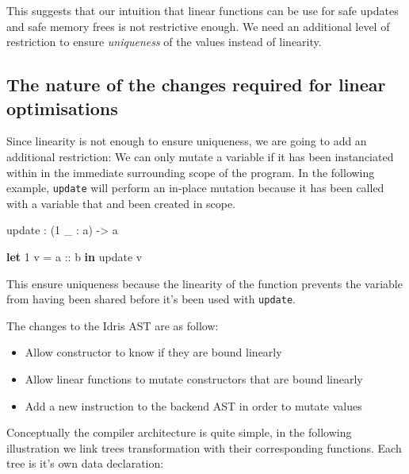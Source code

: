 \documentclass[
]{article}
\newenvironment{Shaded}{}{}
\newcommand{\DecValTok}[1]{\textcolor[rgb]{0.25,0.63,0.44}{#1}}
\newcommand{\KeywordTok}[1]{\textcolor[rgb]{0.00,0.44,0.13}{\textbf{#1}}}
\newcommand{\NormalTok}[1]{#1}
\newcommand{\OperatorTok}[1]{\textcolor[rgb]{0.40,0.40,0.40}{#1}}
\newcommand{\OtherTok}[1]{\textcolor[rgb]{0.00,0.44,0.13}{#1}}
\providecommand{\tightlist}{%
  \setlength{\itemsep}{0pt}\setlength{\parskip}{0pt}}
\begin{document}
This suggests that our intuition that linear functions can be use for
safe updates and safe memory frees is not restrictive enough. We need an
additional level of restriction to ensure \emph{uniqueness} of the
values instead of linearity.

\hypertarget{the-nature-of-the-changes-required-for-linear-optimisations}{%
\subsection{The nature of the changes required for linear
optimisations}\label{the-nature-of-the-changes-required-for-linear-optimisations}}

Since linearity is not enough to ensure uniqueness, we are going to add
an additional restriction: We can only mutate a variable if it has been
instanciated within in the immediate surrounding scope of the program.
In the following example, \texttt{update} will perform an in-place
mutation because it has been called with a variable that and been
created in scope.

\begin{Shaded}
\begin{Highlighting}[]
\NormalTok{update }\OperatorTok{:}\NormalTok{ (}\DecValTok{1}\NormalTok{ \_ }\OperatorTok{:}\NormalTok{ a) }\OtherTok{{-}\textgreater{}}\NormalTok{ a}

\KeywordTok{let} \DecValTok{1}\NormalTok{ v }\OtherTok{= a ::}\NormalTok{ b }\KeywordTok{in}
\NormalTok{    update v}
\end{Highlighting}
\end{Shaded}

This ensure uniqueness because the linearity of the function prevents
the variable from having been shared before it's been used with
\texttt{update}.

The changes to the Idris AST are as follow:

\begin{itemize}
\tightlist
\item
  Allow constructor to know if they are bound linearly
\item
  Allow linear functions to mutate constructors that are bound linearly
\item
  Add a new instruction to the backend AST in order to mutate values
\end{itemize}

Conceptually the compiler architecture is quite simple, in the following
illustration we link trees transformation with their corresponding
functions. Each tree is it's own data declaration:
\end{document}
